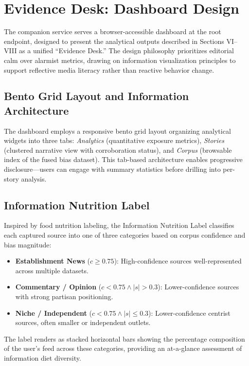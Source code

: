 \documentclass[10pt, conference, compsoc]{IEEEtran}
\begin{document}
\section{Evidence Desk: Dashboard Design}
The companion service serves a browser-accessible dashboard at the root endpoint, designed to present the analytical outputs described in Sections VI--VIII as a unified ``Evidence Desk.'' The design philosophy prioritizes editorial calm over alarmist metrics, drawing on information visualization principles to support reflective media literacy rather than reactive behavior change.

\subsection{Bento Grid Layout and Information Architecture}
The dashboard employs a responsive bento grid layout organizing analytical widgets into three tabs: \textit{Analytics} (quantitative exposure metrics), \textit{Stories} (clustered narrative view with corroboration status), and \textit{Corpus} (browsable index of the fused bias dataset). This tab-based architecture enables progressive disclosure—users can engage with summary statistics before drilling into per-story analysis.

\subsection{Information Nutrition Label}
Inspired by food nutrition labeling, the Information Nutrition Label classifies each captured source into one of three categories based on corpus confidence and bias magnitude:
\begin{itemize}
    \item \textbf{Establishment News} ($c \geq 0.75$): High-confidence sources well-represented across multiple datasets.
    \item \textbf{Commentary / Opinion} ($c < 0.75 \land |s| > 0.3$): Lower-confidence sources with strong partisan positioning.
    \item \textbf{Niche / Independent} ($c < 0.75 \land |s| \leq 0.3$): Lower-confidence centrist sources, often smaller or independent outlets.
\end{itemize}
The label renders as stacked horizontal bars showing the percentage composition of the user's feed across these categories, providing an at-a-glance assessment of information diet diversity.
\end{document}
